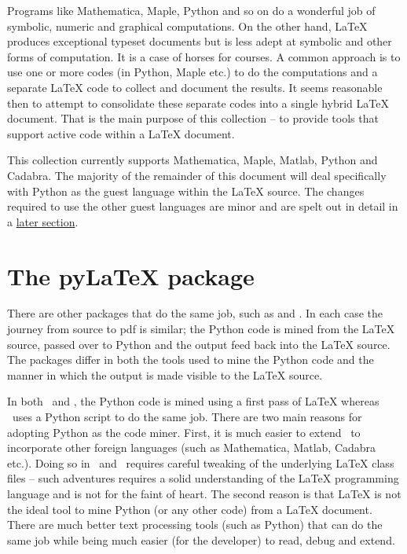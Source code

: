 \documentclass[12pt]{article}
\begin{document}
Programs like Mathematica, Maple, Python and so on do a wonderful job of symbolic,
numeric and graphical computations. On the other hand, LaTeX produces exceptional
typeset documents but is less adept at symbolic and other forms of computation. It
is a case of horses for courses. A common approach is to use one or more codes (in
Python, Maple etc.) to do the computations and a separate LaTeX code to collect and
document the results. It seems reasonable then to attempt to consolidate these
separate codes into a single hybrid LaTeX document. That is the main purpose of
this collection -- to provide tools that support active code within a LaTeX
document.

This collection currently supports Mathematica, Maple, Matlab, Python and Cadabra.
The majority of the remainder of this document will deal specifically with Python
as the guest language within the LaTeX source. The changes required to use the
other guest languages are minor and are spelt out in detail in a
\hyperlink{sec:other-lang}{later section}.

\section{The pyLaTeX package}

There are other packages that do the same job, such as
\href{https://github.com/gpoore/pythontex}{\PythonTeX} and
\href{https://github.com/sagemath/sagetex}{\SageTeX}. In each case the journey from
source to pdf is similar; the Python code is mined from the LaTeX source, passed
over to Python and the output feed back into the LaTeX source. The packages differ
in both the tools used to mine the Python code and the manner in which the output
is made visible to the LaTeX source.

In both \PythonTeX\ and \SageTeX, the Python code is mined using a first pass of
LaTeX whereas \pyLaTeX\ uses a Python script to do the same job. There are two main
reasons for adopting Python as the code miner. First, it is much easier to extend
\pyLaTeX\ to incorporate other foreign languages (such as Mathematica, Matlab,
Cadabra etc.). Doing so in \PythonTeX\ and \SageTeX\ requires careful tweaking of
the underlying LaTeX class files -- such adventures requires a solid understanding
of the LaTeX programming language and is not for the faint of heart. The second
reason is that LaTeX is not the ideal tool to mine Python (or any other code) from
a LaTeX document. There are much better text processing tools (such as Python) that
can do the same job while being much easier (for the developer) to read, debug and
extend.
\end{document}
